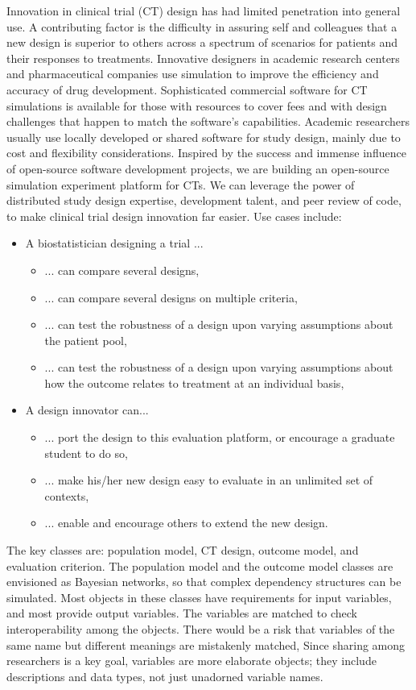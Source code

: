 \documentclass[12pt]{amsart}
\begin{document}
Innovation in clinical trial (CT) design has had limited  penetration into general use.  A contributing factor is the difficulty in assuring self and colleagues that a new design is superior to others across a spectrum of scenarios for patients and their responses to treatments. Innovative designers in academic research centers and pharmaceutical companies use simulation  to improve the efficiency and accuracy of drug development. Sophisticated commercial software for CT simulations is available for those with resources to cover fees and with design challenges that happen to match the software's capabilities. Academic researchers  usually use locally developed or shared software for study design, mainly due to cost and flexibility considerations. 
Inspired by the success and immense influence of open-source software development projects, we are building an open-source simulation experiment platform for CTs. 
We can leverage the power of distributed study design expertise, development talent, and peer review of code,
to make  clinical trial design innovation far easier. Use cases include:
\begin{itemize}
\item A biostatistician designing a trial ...
\begin{itemize}
\item ... can compare several designs,
\item ... can compare several designs on multiple criteria,
\item ... can test the robustness of a design upon varying assumptions about the patient pool,
\item ... can test the robustness of a design upon varying assumptions about how the outcome relates to treatment at an individual basis,

\end{itemize}
\item A design innovator can...	
\begin{itemize}
\item ... port the design to this evaluation platform, or encourage a graduate student to do so,
\item ... make his/her new design easy to evaluate in an unlimited set of contexts,
\item ... enable and encourage others to extend the new design.
\end{itemize}
\end{itemize}


The key classes are: population model, CT design, outcome model, and evaluation criterion. The population model and the outcome model classes are envisioned as Bayesian networks, so that complex dependency structures can be simulated.
Most objects in these classes have requirements for input variables,
and most provide output variables.
The variables are matched to check interoperability among the objects. 
There would be a risk that variables of the same name but different meanings are mistakenly matched,
Since sharing among researchers is a key goal,
variables are more elaborate objects;
they include descriptions and data types, not just unadorned variable names.
\end{document}
